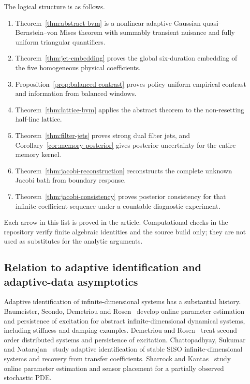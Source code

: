 The logical structure is as follows.
\begin{enumerate}
\item Theorem~\ref{thm:abstract-bvm} is a nonlinear adaptive Gaussian quasi-Bernstein--von Mises theorem with summably transient nuisance and fully uniform triangular quantifiers.
\item Theorem~\ref{thm:jet-embedding} proves the global six-duration embedding of the five homogeneous physical coefficients.
\item Proposition~\ref{prop:balanced-contrast} proves policy-uniform empirical contrast and information from balanced windows.
\item Theorem~\ref{thm:lattice-bvm} applies the abstract theorem to the non-resetting half-line lattice.
\item Theorem~\ref{thm:filter-jets} proves strong dual filter jets, and Corollary~\ref{cor:memory-posterior} gives posterior uncertainty for the entire memory kernel.
\item Theorem~\ref{thm:jacobi-reconstruction} reconstructs the complete unknown Jacobi bath from boundary response.
\item Theorem~\ref{thm:jacobi-consistency} proves posterior consistency for that infinite coefficient sequence under a countable diagnostic experiment.
\end{enumerate}
Each arrow in this list is proved in the article.  Computational checks in the repository verify finite algebraic identities and the source build only; they are not used as substitutes for the analytic arguments.

\subsection{Relation to adaptive identification and adaptive-data asymptotics}
\label{sec:literature}

Adaptive identification of infinite-dimensional systems has a substantial history.  Baumeister, Scondo, Demetriou and Rosen~\cite{Baumeister1997} develop online parameter estimation and persistence of excitation for abstract infinite-dimensional dynamical systems, including stiffness and damping examples.  Demetriou and Rosen~\cite{DemetriouRosen1994Inverse,DemetriouRosen1994PE} treat second-order distributed systems and persistence of excitation.  Chattopadhyay, Sukumar and Natarajan~\cite{Chattopadhyay2025} study adaptive identification of stable SISO infinite-dimensional systems and recovery from transfer coefficients.  Sharrock and Kantas~\cite{SharrockKantas2022} study online parameter estimation and sensor placement for a partially observed stochastic PDE.

